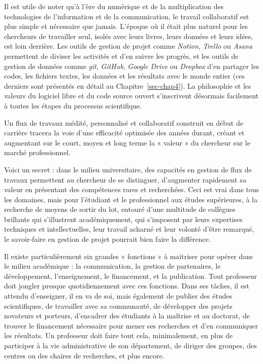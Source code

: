 \documentclass[
  letterpaper,
  DIV=11,
  numbers=noendperiod,
  oneside]{scrreprt}
\begin{document}
Il est utile de noter qu'à l'ère du numérique et de la multiplication
des technologies de l'information et de la communication, le travail
collaboratif est plus simple et nécessaire que jamais. L'époque où il
était plus naturel pour les chercheurs de travailler seul, isolés avec
leurs livres, leurs données et leurs idées, est loin derrière. Les
outils de gestion de projet comme \emph{Notion}, \emph{Trello} ou
\emph{Asana} permettent de diviser les activités et d'en suivre les
progrès, et les outils de gestion de données comme \emph{git},
\emph{GitHub}, \emph{Google Drive} ou \emph{Dropbox} d'en partager les
codes, les fichiers textes, les données et les résultats avec le monde
entier (ces derniers sont présentés en détail au
Chapitre~\ref{sec-chap4}). La philosophie et les valeurs du logiciel
libre et du code source ouvert s'inscrivent désormais facilement à
toutes les étapes du processus scientifique.

Un flux de travaux médité, personnalisé et collaboratif construit en
début de carrière tracera la voie d'une efficacité optimisée des années
durant, créant et augmentant sur le court, moyen et long terme la «
valeur » du chercheur sur le marché professionnel.

Voici un secret : dans le milieu universitaire, des capacités en gestion
de flux de travaux permettent au chercheur de se distinguer, d'augmenter
rapidement sa valeur en présentant des compétences rares et recherchées.
Ceci est vrai dans tous les domaines, mais pour l'étudiant et le
professionnel aux études supérieures, à la recherche de moyens de sortir
du lot, entouré d'une multitude de collègues brillants qui s'illustrent
académiquement, qui s'imposent par leurs expertises techniques et
intellectuelles, leur travail acharné et leur volonté d'être remarqué,
le savoir-faire en gestion de projet pourrait bien faire la différence.

Il existe particulièrement six grandes « fonctions » à maitriser pour
opérer dans le milieu académique : la communication, la gestion de
partenaires, le développement, l'enseignement, le financement, et la
publication. Tout professeur doit jongler presque quotidiennement avec
ces fonctions. Dans ses tâches, il est attendu d'enseigner, il en va de
soi, mais également de publier des études scientifiques, de travailler
avec sa communauté, de développer des projets novateurs et porteurs,
d'encadrer des étudiants à la maîtrise et au doctorat, de trouver le
financement nécessaire pour mener ses recherches et d'en communiquer les
résultats. Un professeur doit faire tout cela, minimalement, en plus de
participer à la vie administrative de son département, de diriger des
groupes, des centres ou des chaires de recherches, et plus encore.
\end{document}
